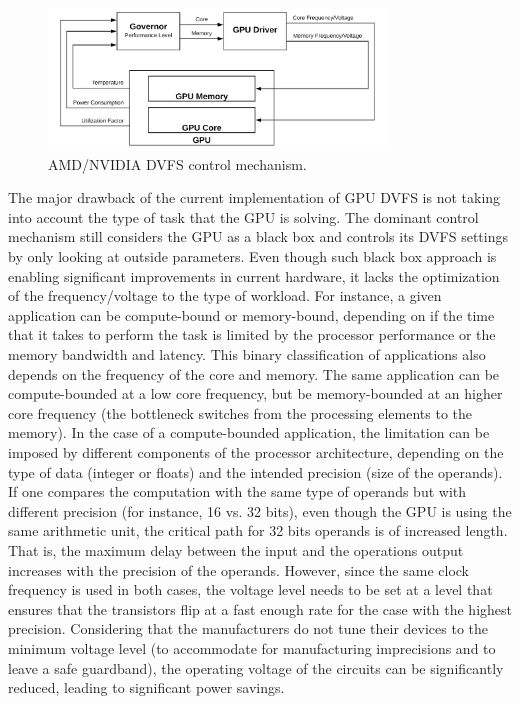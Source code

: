 \begin{figure}[!htb]
  \centering
  \includegraphics[width=0.8\textwidth]{Figures/StateArt/DVFS.png}
  \caption[Controller]{AMD/NVIDIA DVFS control mechanism.}
  \label{fig:DVFSmechanism}
\end{figure}

The major drawback of the current implementation of GPU DVFS is not taking into account the type of task that the GPU is solving. The dominant control mechanism still considers the GPU as a black box and controls its DVFS settings by only looking at outside parameters. Even though such black box approach is enabling significant improvements in current hardware, it lacks the optimization of the frequency/voltage to the type of workload. For instance, a given application can be compute-bound or memory-bound, depending on if the time that it takes to perform the task is limited by the processor performance or the memory bandwidth and latency. This binary classification of applications also depends on the frequency of the core and memory. The same application can be compute-bounded at a low core frequency, but be memory-bounded at an higher core frequency \cite{guerreiro_dvfs-aware_2019} (the bottleneck switches from the processing elements to the memory). In the case of a compute-bounded application, the limitation can be imposed by different components of the processor architecture, depending on the type of data (integer or floats) and the intended precision (size of the operands). If one compares the computation with the same type of operands but with different precision (for instance, 16 vs. 32 bits), even though the GPU is using the same arithmetic unit, the critical path for 32 bits operands is of increased length. That is, the maximum delay between the input and the operations output increases with the precision of the operands. However, since the same clock frequency is used in both cases, the voltage level needs to be set at a level that ensures that the transistors flip at a fast enough rate for the case with the highest precision. Considering that the manufacturers do not tune their devices to the minimum voltage level (to accommodate for manufacturing imprecisions and to leave a safe guardband), the operating voltage of the circuits can be significantly reduced, leading to significant power savings. 


